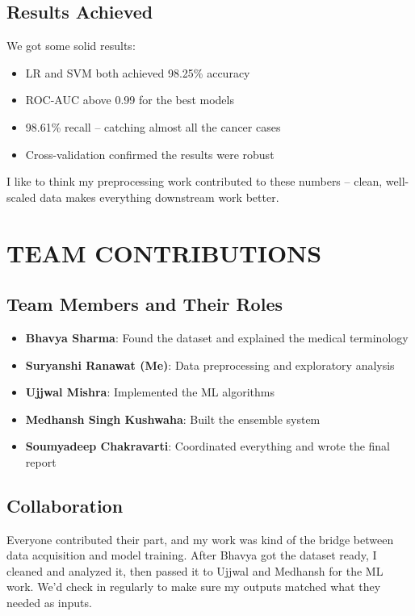 \documentclass[12pt]{article}
\begin{document}
\subsection{Results Achieved}
We got some solid results:
\begin{itemize}
    \item LR and SVM both achieved 98.25\% accuracy
    \item ROC-AUC above 0.99 for the best models
    \item 98.61\% recall -- catching almost all the cancer cases
    \item Cross-validation confirmed the results were robust
\end{itemize}

I like to think my preprocessing work contributed to these numbers -- clean, well-scaled data makes everything downstream work better.

\newpage
\section{TEAM CONTRIBUTIONS}

\subsection{Team Members and Their Roles}

\begin{itemize}
    \item \textbf{Bhavya Sharma}: Found the dataset and explained the medical terminology
    \item \textbf{Suryanshi Ranawat (Me)}: Data preprocessing and exploratory analysis
    \item \textbf{Ujjwal Mishra}: Implemented the ML algorithms
    \item \textbf{Medhansh Singh Kushwaha}: Built the ensemble system
    \item \textbf{Soumyadeep Chakravarti}: Coordinated everything and wrote the final report
\end{itemize}

\subsection{Collaboration}
Everyone contributed their part, and my work was kind of the bridge between data acquisition and model training. After Bhavya got the dataset ready, I cleaned and analyzed it, then passed it to Ujjwal and Medhansh for the ML work. We'd check in regularly to make sure my outputs matched what they needed as inputs.
\end{document}

